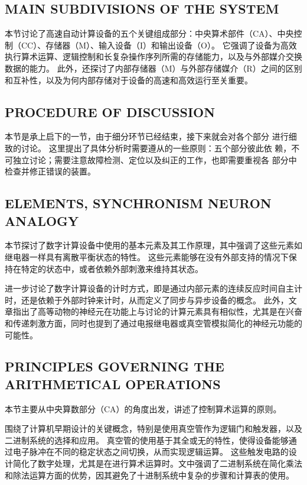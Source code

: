 \documentclass[12pt]{article} %
\theoremstyle{definition}
\begin{document}
\subsection{MAIN SUBDIVISIONS OF THE SYSTEM}

本节讨论了高速自动计算设备的五个关键组成部分：中央算术部件（CA）、中央控制（CC）、存储器（M）、输入设备（I）和输出设备（O）。
它强调了设备为高效执行算术运算、逻辑控制和长复杂操作序列所需的存储能力，以及与外部媒介交换数据的能力。
此外，还探讨了内部存储器（M）与外部存储媒介（R）之间的区别和互补性，以及为何内部存储对于设备的高速和高效运行至关重要。

\subsection{PROCEDURE OF DISCUSSION}

本节是承上启下的一节，由于细分环节已经结束，接下来就会对各个部分
进行细致的讨论。
这里提出了具体分析时需要遵从的一些原则：五个部分彼此依
赖，不可独立讨论；需要注意故障检测、定位以及纠正的工作，也即需要重视各
部分中检查并修正错误的装置。

\subsection{ELEMENTS, SYNCHRONISM NEURON ANALOGY}

本节探讨了数字计算设备中使用的基本元素及其工作原理，其中强调了这些元素如继电器一样具有离散平衡状态的特性。
这些元素能够在没有外部支持的情况下保持在特定的状态中，或者依赖外部刺激来维持其状态。

进一步讨论了数字计算设备的计时方式，即是通过内部元素的连续反应时间自主计时，还是依赖于外部时钟来计时，从而定义了同步与异步设备的概念。
此外，文章指出了高等动物的神经元在功能上与讨论的计算元素具有相似性，尤其是在兴奋和传递刺激方面，同时也提到了通过电报继电器或真空管模拟简化的神经元功能的可能性。

\subsection{PRINCIPLES GOVERNING THE ARITHMETICAL OPERATIONS}

本节主要从中央算数部分（CA）的角度出发，讲述了控制算术运算的原则。

围绕了计算机早期设计的关键概念，特别是使用真空管作为逻辑门和触发器，以及二进制系统的选择和应用。
真空管的使用基于其全或无的特性，使得设备能够通过电子脉冲在不同的稳定状态之间切换，从而实现逻辑运算。
这些触发电路的设计简化了数字处理，尤其是在进行算术运算时。文中强调了二进制系统在简化乘法和除法运算方面的优势，因其避免了十进制系统中复杂的步骤和计算表的使用。
\end{document}

